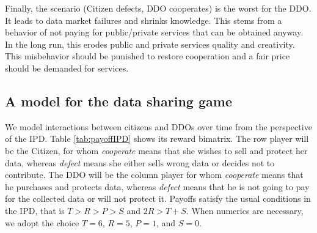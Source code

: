 Finally, the scenario (Citizen defects, DDO cooperates) is the worst for the DDO. It leads to data market failures and shrinks knowledge. This  
stems from  a behavior of not paying for
public/private services that can be obtained anyway. 
In the long run, this erodes public and private services quality and creativity. This misbehavior should be punished to restore cooperation and a fair price should be demanded for services.



\subsection{A model for the data sharing game}\label{sec:models}

We model interactions between citizens and DDOs over 
time from the perspective of the IPD. %
Table \ref{tab:payoffIPD} shows its reward bimatrix. 
The row player will be the Citizen, for whom {\em cooperate} means that she
wishes to sell and protect her data, whereas {\em defect} means she either sells wrong data or decides not to contribute. The DDO will be the column player
for whom {\em cooperate} means that he purchases and protects data,
whereas {\em defect} means that he is not going to pay for the collected data or will not protect it.
Payoffs satisfy the usual conditions in the IPD, that is $T>R>P>S$ and $2R > T+S$.
When numerics are necessary,
we adopt the choice $T= 6 $, $R= 5 $, $ P = 1 $,  and $S= 0 $.


